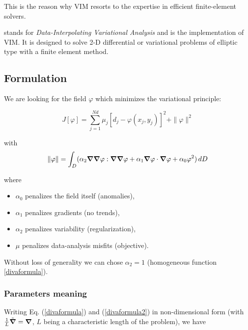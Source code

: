 This is the reason why VIM resorts to the expertise in efficient finite-element solvers.

\diva stands for \textit{Data-Interpolating Variational Analysis} and is the implementation of VIM. It is designed to solve 2-D differential or variational problems of elliptic type with a finite element method.


\subsection{Formulation\label{sec:formulation}}

We are looking for the field $\varphi$ which minimizes the variational principle:

\begin{equation}
J \left[\varphi\right] =\sum_{j=1}^{Nd}\mu_{j}\left[d_{j}-\varphi(x_{j},y_{j})\right]^{2}+
\| \varphi\| ^{2}
\label{divaformula}
\end{equation}

with
\begin{equation}
\|\varphi\|=\int_{D}(
\alpha_{2} 
\boldsymbol{\nabla}\boldsymbol{\nabla}\varphi : \boldsymbol{\nabla}\boldsymbol{\nabla}\varphi +\alpha_{1}
\boldsymbol{\nabla}\varphi \cdot \boldsymbol{\nabla}\varphi + \alpha_{0} \varphi^{2})\, d D
\label{divaformula2}
\end{equation}

where
\begin{itemize}
\item
$\alpha_0$ penalizes the field itself (anomalies),
\item
$\alpha_1$ penalizes gradients (no trends),
\item 
$\alpha_2$ penalizes variability (regularization),
\item 
$\mu$ penalizes data-analysis misfits (objective).
\end{itemize}
Without loss of generality we can chose $\alpha_2=1$ (homogeneous function \ref{divaformula}).



\subsubsection{Parameters meaning\label{sec:parammeaning}}

Writing Eq. (\ref{divaformula}) and (\ref{divaformula2}) in non-dimensional form (with $\frac{1}{L}\tilde{\boldsymbol{\nabla}}=\boldsymbol{\nabla}$, $L$ being a characteristic length of the problem), we have

